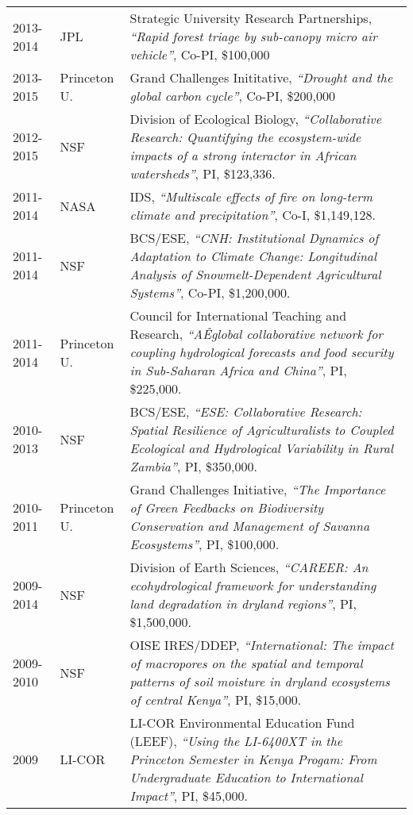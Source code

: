 \documentclass[10pt]{report}
\begin{document}
\begin{longtable}{ l p{.8in} p{5in}  }
2013-2014 & JPL & Strategic University Research Partnerships, \emph{``Rapid forest triage by sub-canopy micro air vehicle''}, Co-PI, \$100,000 \\

2013-2015 & Princeton U. & Grand Challenges Inititative, \emph{``Drought and the global carbon cycle''}, Co-PI, \$200,000 \\ 

2012-2015 & NSF & Division of Ecological Biology, \emph{``Collaborative Research: Quantifying the ecosystem-wide impacts of a strong interactor in African watersheds''}, PI, \$123,336. \\

2011-2014 & NASA & IDS, \emph{``Multiscale effects of fire on long-term climate and precipitation''}, Co-I, \$1,149,128. \\

2011-2014 & NSF & BCS/ESE, \emph{``CNH: Institutional Dynamics of Adaptation to Climate Change: Longitudinal Analysis of Snowmelt-Dependent Agricultural Systems''}, Co-PI, \$1,200,000. \\

2011-2014 & Princeton U. & Council for International Teaching and Research, \emph{``AÊglobal collaborative network for coupling hydrological forecasts and food security in Sub-Saharan Africa and China''}, PI, \$225,000. \\
	
2010-2013 & NSF & BCS/ESE, \emph{``ESE: Collaborative Research: Spatial Resilience of Agriculturalists to Coupled Ecological and Hydrological Variability in Rural Zambia''}, PI, \$350,000. \\

2010-2011 & Princeton U. & Grand Challenges Initiative, \emph{``The Importance of Green Feedbacks on Biodiversity Conservation and Management of Savanna Ecosystems''}, PI, \$100,000. \\

2009-2014 & NSF & Division of Earth Sciences, \emph{``CAREER: An ecohydrological framework for understanding land degradation in dryland regions''}, PI, \$1,500,000. \\

2009-2010 & NSF & OISE IRES/DDEP, \emph{``International: The impact of macropores on the spatial and temporal patterns of soil moisture in dryland ecosystems of central Kenya''}, PI, \$15,000. \\

2009 & LI-COR & LI-COR Environmental Education Fund (LEEF), \emph{``Using the LI-6400XT in the Princeton Semester in Kenya Progam: From Undergraduate Education to International Impact''}, PI, \$45,000. \\


\end{longtable}
\end{document}
